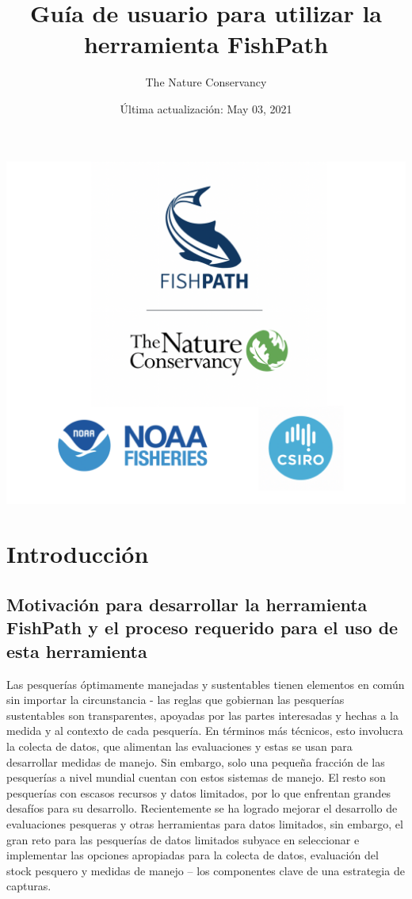 \documentclass[
  11pt,
]{book}
\title{Guía de usuario para utilizar la herramienta FishPath}
\author{The Nature Conservancy}
\date{Última actualización: May 03, 2021}
\begin{document}
\maketitle

{
\setcounter{tocdepth}{1}
\tableofcontents
}
\hypertarget{section}{%
\chapter*{}\label{section}}

\begin{center}\includegraphics[width=0.75\linewidth]{images/3-logos} \end{center}

\hypertarget{intro}{%
\chapter{Introducción}\label{intro}}

\hypertarget{motivation}{%
\section{Motivación para desarrollar la herramienta FishPath y el proceso requerido para el uso de esta herramienta}\label{motivation}}

Las pesquerías óptimamente manejadas y sustentables tienen elementos en común sin importar la circunstancia - las reglas que gobiernan las pesquerías sustentables son transparentes, apoyadas por las partes interesadas y hechas a la medida y al contexto de cada pesquería. En términos más técnicos, esto involucra la colecta de datos, que alimentan las evaluaciones y estas se usan para desarrollar medidas de manejo. Sin embargo, solo una pequeña fracción de las pesquerías a nivel mundial cuentan con estos sistemas de manejo. El resto son pesquerías con escasos recursos y datos limitados, por lo que enfrentan grandes desafíos para su desarrollo. Recientemente se ha logrado mejorar el desarrollo de evaluaciones pesqueras y otras herramientas para datos limitados, sin embargo, el gran reto para las pesquerías de datos limitados subyace en seleccionar e implementar las opciones apropiadas para la colecta de datos, evaluación del stock pesquero y medidas de manejo -- los componentes clave de una estrategia de capturas.
\end{document}
